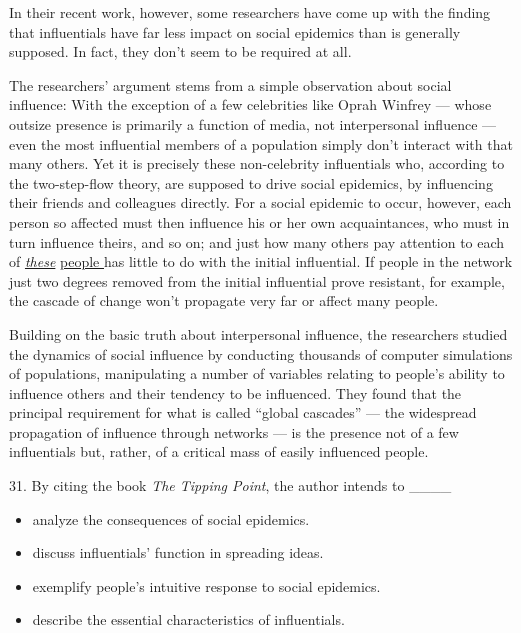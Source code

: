 \documentclass[UTF8,11pt]{ctexart}
\begin{document}
In their recent work, however, some researchers have come up with the finding that influentials have far less impact on social epidemics than is generally supposed. In fact, they don’t seem to be required at all.


The researchers’ argument stems from a simple observation about social influence: With the exception of a few celebrities like Oprah Winfrey — whose outsize presence is primarily a function of media, not interpersonal influence — even the most influential members of a population simply don’t interact with that many others. Yet it is precisely these non-celebrity influentials who, according to the two-step-flow theory, are supposed to drive social epidemics, by influencing their friends and colleagues directly. For a social epidemic to occur, however, each person so affected must then influence his or her own acquaintances, who must in turn influence theirs, and so on; and just how many others pay attention to each of \textit{\uline{these}} \uline{people }has little to do with the initial influential. If people in the network just two degrees removed from the initial influential prove resistant, for example, the cascade of change won’t propagate very far or affect many people.


Building on the basic truth about interpersonal influence, the researchers studied the dynamics of social influence by conducting thousands of computer simulations of populations, manipulating a number of variables relating to people’s ability to influence others and their tendency to be influenced. They found that the principal requirement for what is called “global cascades” — the widespread propagation of influence through networks — is the presence not of a few influentials but, rather, of a critical mass of easily influenced people.


31. By citing the book \textit{The Tipping Point}, the author intends to \_\_\_\_


\begin{itemize}[leftmargin=2em,itemsep=.2em,topsep=.4em]\item[A.] analyze the consequences of social epidemics.
\item[B.] discuss influentials’ function in spreading ideas.
\item[C.] exemplify people’s intuitive response to social epidemics.
\item[D.] describe the essential characteristics of influentials.
\end{itemize}
\end{document}
